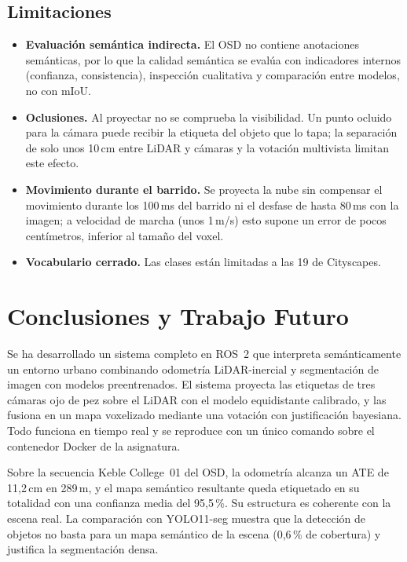 \documentclass[11pt, twoside]{article}
\begin{document}
\subsection{Limitaciones}

\begin{itemize}[noitemsep]
  \item \textbf{Evaluación semántica indirecta.} El OSD no contiene anotaciones semánticas, por lo que la calidad semántica se evalúa con indicadores internos (confianza, consistencia), inspección cualitativa y comparación entre modelos, no con mIoU.
  \item \textbf{Oclusiones.} Al proyectar no se comprueba la visibilidad. Un punto ocluido para la cámara puede recibir la etiqueta del objeto que lo tapa; la separación de solo unos 10\,cm entre LiDAR y cámaras y la votación multivista limitan este efecto.
  \item \textbf{Movimiento durante el barrido.} Se proyecta la nube sin compensar el movimiento durante los 100\,ms del barrido ni el desfase de hasta 80\,ms con la imagen; a velocidad de marcha (unos 1\,m/s) esto supone un error de pocos centímetros, inferior al tamaño del voxel.
  \item \textbf{Vocabulario cerrado.} Las clases están limitadas a las 19 de Cityscapes.
\end{itemize}

\section{Conclusiones y Trabajo Futuro}

Se ha desarrollado un sistema completo en ROS~2 que interpreta semánticamente un entorno urbano combinando odometría LiDAR-inercial y segmentación de imagen con modelos preentrenados. El sistema proyecta las etiquetas de tres cámaras ojo de pez sobre el LiDAR con el modelo equidistante calibrado, y las fusiona en un mapa voxelizado mediante una votación con justificación bayesiana. Todo funciona en tiempo real y se reproduce con un único comando sobre el contenedor Docker de la asignatura.

Sobre la secuencia Keble College~01 del OSD, la odometría alcanza un ATE de 11,2\,cm en 289\,m, y el mapa semántico resultante queda etiquetado en su totalidad con una confianza media del 95,5\,\%. Su estructura es coherente con la escena real. La comparación con YOLO11-seg muestra que la detección de objetos no basta para un mapa semántico de la escena (0,6\,\% de cobertura) y justifica la segmentación densa.
\end{document}
